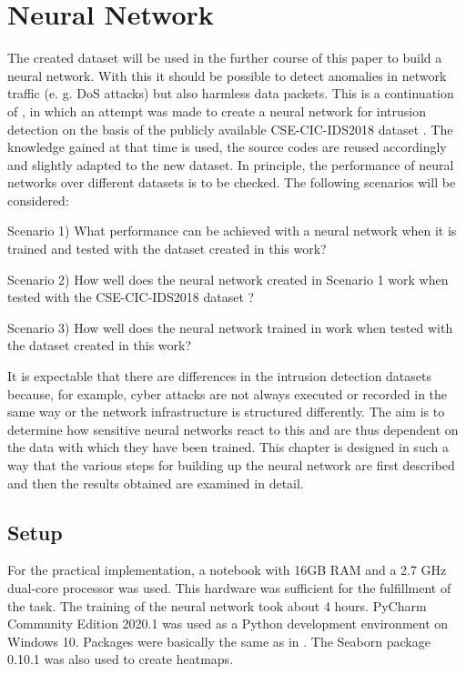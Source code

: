 \documentclass[conference]{IEEEtran}
\begin{document}
\section{Neural Network}\label{nn}
The created dataset will be used in the further course of this paper to build a neural network. With this it should be possible to detect anomalies in network traffic (e. g. DoS attacks) but also harmless data packets. This is a continuation of  \cite{max1}, in which an attempt was made to create a neural network for intrusion detection on the basis of the publicly available CSE-CIC-IDS2018 dataset  \cite{max2}. The knowledge gained at that time is used, the source codes are reused accordingly and slightly adapted to the new dataset. In principle, the performance of neural networks over different datasets is to be checked. The following scenarios will be considered:
\smallskip

Scenario 1) What performance can be achieved with a neural network when it is trained and tested with the dataset created in this work? 
\smallskip

Scenario 2) How well does the neural network created in Scenario 1 work when tested with the CSE-CIC-IDS2018 dataset  \cite{max2}? 
\smallskip

Scenario 3) How well does the neural network trained in \cite{max1} work when tested with the dataset created in this work?
\smallskip

It is expectable that there are differences in the intrusion detection datasets because, for example, cyber attacks are not always executed or recorded in the same way or the network infrastructure is structured differently. The aim is to determine how sensitive neural networks react to this and are thus dependent on the data with which they have been trained. This chapter is designed in such a way that the various steps for building up the neural network are first described and then the results obtained are examined in detail.

\subsection{Setup}
For the practical implementation, a notebook with 16GB RAM and a 2.7 GHz dual-core processor was used. This hardware was sufficient for the fulfillment of the task. The training of the neural network took about 4 hours. PyCharm Community Edition 2020.1 was used as a Python development environment on Windows 10. Packages were basically the same as in \cite{max1}. The Seaborn package 0.10.1 was also used to create heatmaps.
\end{document}

